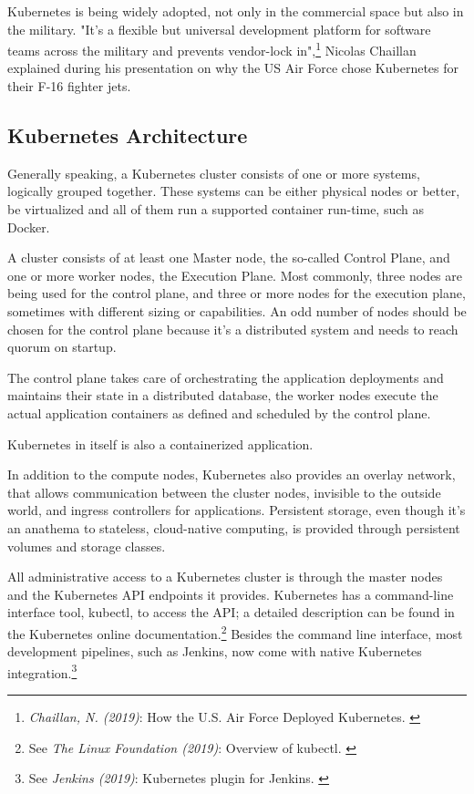 Kubernetes is being widely adopted, not only in the commercial space but also in the military. "It’s a flexible but universal development platform for software teams across the military and prevents vendor-lock in",\footnote{\textit{Chaillan, N. (2019)}: How the U.S. Air Force Deployed Kubernetes. \cite{airForce}} Nicolas Chaillan explained during his presentation on why the US Air Force chose Kubernetes for their F-16 fighter jets.

\subsection{Kubernetes Architecture}

Generally speaking, a Kubernetes cluster consists of one or more systems, logically grouped together. These systems can be either physical nodes or better, be virtualized and all of them run a supported container run-time, such as Docker.

A cluster consists of at least one Master node, the so-called Control Plane, and one or more worker nodes, the Execution Plane. Most commonly, three nodes are being used for the control plane, and three or more nodes for the execution plane, sometimes with different sizing or capabilities. An odd number of nodes should be chosen for the control plane because it's a distributed system and needs to reach quorum on startup.

The control plane takes care of orchestrating the application deployments and maintains their state in a distributed database, the worker nodes execute the actual application containers as defined and scheduled by the control plane.

Kubernetes in itself is also a containerized application.

In addition to the compute nodes, Kubernetes also provides an overlay network, that allows communication between the cluster nodes, invisible to the outside world, and ingress controllers for applications. Persistent storage, even though it's an anathema to stateless, cloud-native computing, is provided through persistent volumes and storage classes.

All administrative access to a Kubernetes cluster is through the master nodes and the Kubernetes API endpoints it provides. Kubernetes has a command-line interface tool, kubectl, to access the API; a detailed description can be found in the Kubernetes online documentation.\footnote{See \textit{The Linux Foundation (2019)}: Overview of kubectl. \cite{kubectl}} Besides the command line interface, most development pipelines, such as Jenkins, now come with native Kubernetes integration.\footnote{See \textit{Jenkins (2019)}: Kubernetes plugin for Jenkins. \cite{jenkinsK8s}}

